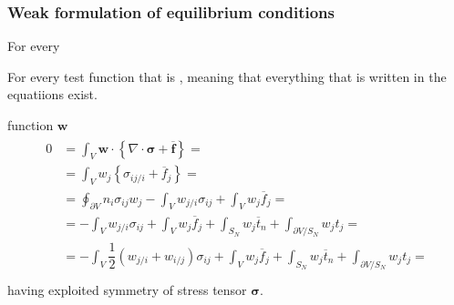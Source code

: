 \documentclass[letterpaper,10pt,english]{jupyterBook}
\begin{document}
\subsubsection{Weak formulation of equilibrium conditions}
\label{\detokenize{ch/solids/small-displacements-statics-weak-form-3d:weak-formulation-of-equilibrium-conditions}}\label{\detokenize{ch/solids/small-displacements-statics-weak-form-3d:solid-mechanics-intro-small-displacements-statics-weak-form-weak-equilibrium}}
\sphinxAtStartPar
For every%
\begin{footnote}[1]\sphinxAtStartFootnote
For every test function that is , meaning that everything that is written in the equatiions exist.
%
\end{footnote} function \(\mathbf{w}\)
\begin{equation*}
\begin{split}\begin{aligned}
0 & = \int_{V} \mathbf{w} \cdot \left\{ \nabla \cdot \boldsymbol\sigma + \overline{\boldsymbol{f}} \right\} = \\
  & = \int_{V} w_j \left\{ \sigma_{ij/i} + \overline{f}_j \right\} = \\
  & = \oint_{\partial V} n_i \sigma_{ij} w_j - \int_{V} w_{j/i} \sigma_{ij} + \int_{V}  w_j \overline{f}_j = \\
  & = - \int_{V} w_{j/i} \sigma_{ij} + \int_{V}  w_j \overline{f}_j + \int_{S_N} w_j \overline{t}_n + \int_{\partial V / S_N} w_j t_j = \\
  & = - \int_{V} \dfrac{1}{2} \left(  w_{j/i} + w_{i/j} \right) \sigma_{ij} + \int_{V}  w_j \overline{f}_j + \int_{S_N} w_j \overline{t}_n + \int_{\partial V / S_N} w_j t_j = \\
\end{aligned}\end{split}
\end{equation*}
\sphinxAtStartPar
having exploited symmetry of stress tensor \(\boldsymbol\sigma\).
\end{document}
